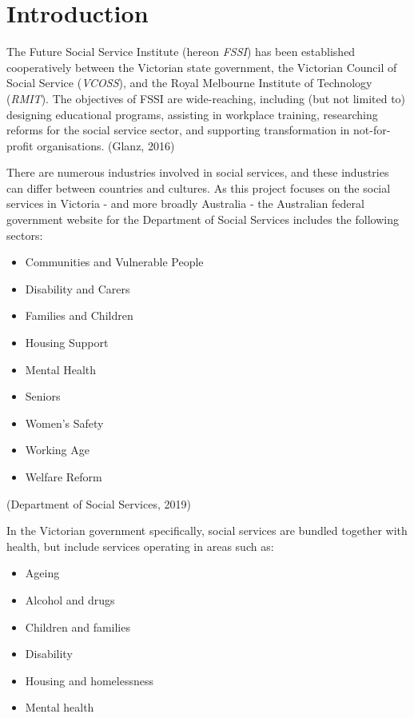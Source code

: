 \documentclass[
  11pt,
]{article}
\providecommand{\tightlist}{%
  \setlength{\itemsep}{0pt}\setlength{\parskip}{0pt}}
\begin{document}
\twocolumn

\hypertarget{introduction}{%
\section{Introduction}\label{introduction}}

The Future Social Service Institute (hereon \emph{FSSI}) has been established cooperatively between the Victorian state government, the Victorian Council of Social Service (\emph{VCOSS}), and the Royal Melbourne Institute of Technology (\emph{RMIT}). The objectives of FSSI are wide-reaching, including (but not limited to) designing educational programs, assisting in workplace training, researching reforms for the social service sector, and supporting transformation in not-for-profit organisations. (Glanz, 2016)

There are numerous industries involved in social services, and these industries can differ between countries and cultures. As this project focuses on the social services in Victoria - and more broadly Australia - the Australian federal government website for the Department of Social Services includes the following sectors:

\begin{itemize}
\tightlist
\item
  Communities and Vulnerable People
\item
  Disability and Carers
\item
  Families and Children
\item
  Housing Support
\item
  Mental Health
\item
  Seniors
\item
  Women's Safety
\item
  Working Age
\item
  Welfare Reform
\end{itemize}

(Department of Social Services, 2019)

In the Victorian government specifically, social services are bundled together with health, but include services operating in areas such as:

\begin{itemize}
\tightlist
\item
  Ageing
\item
  Alcohol and drugs
\item
  Children and families
\item
  Disability
\item
  Housing and homelessness
\item
  Mental health
\end{itemize}
\end{document}

